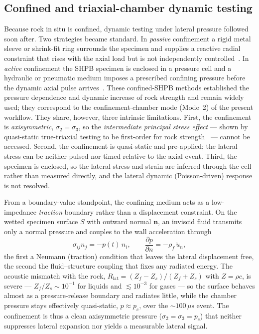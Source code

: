 \documentclass[sn-basic]{sn-jnl}
\begin{document}
\subsection{Confined and triaxial-chamber dynamic testing}

Because rock in situ is confined, dynamic testing under lateral pressure followed
soon after. Two strategies became standard. In \emph{passive} confinement a rigid
metal sleeve or shrink-fit ring surrounds the specimen and supplies a reactive
radial constraint that rises with the axial load but is not independently
controlled~\citep{christensen1972}. In \emph{active} confinement the SHPB specimen
is enclosed in a pressure cell and a hydraulic or pneumatic medium imposes a
prescribed confining pressure before the dynamic axial pulse
arrives~\citep{lindholm1974}. These confined-SHPB methods established the pressure
dependence and dynamic increase of rock strength and remain widely used; they
correspond to the confinement-chamber mode (Mode~2) of the present workflow. They
share, however, three intrinsic limitations. First, the confinement is
\emph{axisymmetric}, $\sigma_2=\sigma_3$, so the \emph{intermediate principal
stress effect} --- shown by quasi-static true-triaxial testing to be first-order
for rock strength~\citep{mogi1971} --- cannot be accessed. Second, the confinement
is quasi-static and pre-applied; the lateral stress can be neither pulsed nor
timed relative to the axial event. Third, the specimen is enclosed, so the
lateral stress and strain are inferred through the cell rather than measured
directly, and the lateral dynamic (Poisson-driven) response is not resolved.

From a boundary-value standpoint, the confining medium acts as a low-impedance
\emph{traction} boundary rather than a displacement constraint. On the wetted
specimen surface $S$ with outward normal $\mathbf{n}$, an inviscid fluid transmits
only a normal pressure and couples to the wall acceleration through
\begin{equation}
\sigma_{ij}n_j=-p(t)\,n_i,\qquad
\frac{\partial p}{\partial n}=-\rho_f\,\ddot{u}_n,
\label{eq:fluidbc}
\end{equation}
the first a Neumann (traction) condition that leaves the lateral displacement
free, the second the fluid--structure coupling that fixes any radiated energy.
The acoustic mismatch with the rock, $R_{\mathrm{lat}}=(Z_f-Z_s)/(Z_f+Z_s)$ with
$Z=\rho c$, is severe --- $Z_f/Z_s\sim10^{-1}$ for liquids and $\lesssim10^{-3}$
for gases --- so the surface behaves almost as a pressure-release boundary and
radiates little, while the chamber pressure stays effectively quasi-static,
$p\approx p_c$, over the $\sim\!100\,\mu\mathrm{s}$ event. The confinement is thus
a clean axisymmetric pressure ($\sigma_2=\sigma_3=p_c$) that neither suppresses
lateral expansion nor yields a measurable lateral signal.
\end{document}
